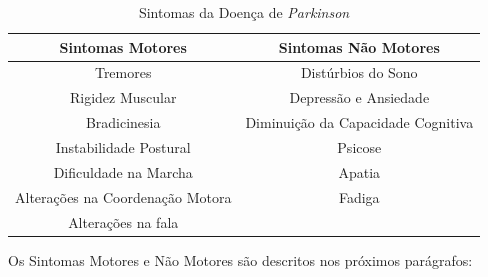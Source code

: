 \documentclass[12pt,a4paper,twoside]{report}
\begin{document}
{\begin{table}[h]
\small
\caption{Sintomas da Doença de \textit{Parkinson}}
\label{tab:numeros}
\centering
\begin{tabular}{c c}
\hline
\textbf{Sintomas Motores} & \textbf{Sintomas Não Motores} \\ 
\hline
Tremores & Distúrbios do Sono \\ 
Rigidez Muscular  &  Depressão e Ansiedade \\ 
Bradicinesia  &   Diminuição da Capacidade Cognitiva\\ 
Instabilidade Postural  & Psicose\\ 
Dificuldade na Marcha   & Apatia\\ 
Alterações na Coordenação Motora & Fadiga    \\
Alterações na fala    \\
\end{tabular}
\end{table}

Os Sintomas Motores e Não Motores são descritos nos próximos parágrafos:

}
\end{document}
